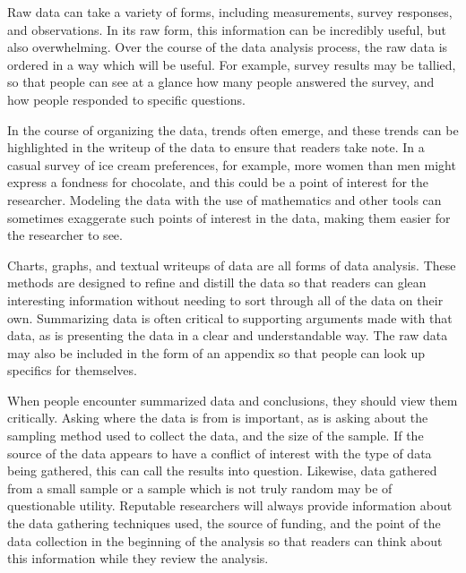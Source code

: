 Raw data can take a variety of forms, including measurements, survey responses, and observations. In its raw form, this information can be incredibly useful, but also overwhelming. Over the course of the data analysis process, the raw data is ordered in a way which will be useful. For example, survey results may be tallied, so that people can see at a glance how many people answered the survey, and how people responded to specific questions.

In the course of organizing the data, trends often emerge, and these trends can be highlighted in the writeup of the data to ensure that readers take note. In a casual survey of ice cream preferences, for example, more women than men might express a fondness for chocolate, and this could be a point of interest for the researcher. Modeling the data with the use of mathematics and other tools can sometimes exaggerate such points of interest in the data, making them easier for the researcher to see.

Charts, graphs, and textual writeups of data are all forms of data analysis. These methods are designed to refine and distill the data so that readers can glean interesting information without needing to sort through all of the data on their own. Summarizing data is often critical to supporting arguments made with that data, as is presenting the data in a clear and understandable way. The raw data may also be included in the form of an appendix so that people can look up specifics for themselves.

When people encounter summarized data and conclusions, they should view them critically. Asking where the data is from is important, as is asking about the sampling method used to collect the data, and the size of the sample. If the source of the data appears to have a conflict of interest with the type of data being gathered, this can call the results into question. Likewise, data gathered from a small sample or a sample which is not truly random may be of questionable utility. Reputable researchers will always provide information about the data gathering techniques used, the source of funding, and the point of the data collection in the beginning of the analysis so that readers can think about this information while they review the analysis.


